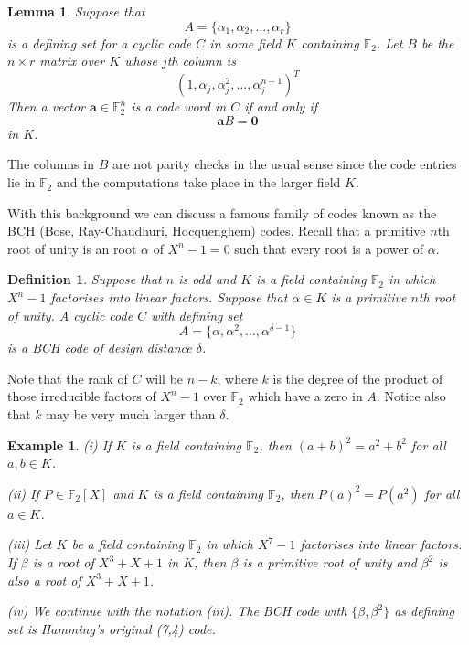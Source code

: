 \documentclass[12pt,a4paper]{article}
\theoremstyle{plain}
\newtheorem{lemma}[theorem]{Lemma}
\newtheorem{definition}[theorem]{Definition}
\newtheorem{example}[theorem]{Example}
\theoremstyle{definition}
\begin{document}
    \begin{lemma}
        \label{field check} Suppose that
        \[A=\{\alpha_{1},\alpha_{2},\dots,\alpha_{r}\}\]
        is a defining set for a cyclic
        code $C$  in some
        field $K$ containing ${\mathbb F}_{2}$.
        Let $B$ be the $n\times r$ matrix over $K$
        whose $j$th column is
        \[(1,\alpha_{j},\alpha_{j}^{2},\dots,\alpha_{j}^{n-1})^{T}\]
        Then a vector ${\mathbf a}\in{\mathbb F}_{2}^{n}$
        is a code word in $C$ if and only if
        \[{\mathbf a}B={\boldsymbol 0}\]
        in $K$.
    \end{lemma}
    \noindent
    The columns in $B$ are not parity checks in the usual
    sense since the code entries lie in ${\mathbb F}_{2}$
    and the computations take place in the larger field $K$.

    With this background we can
    discuss a famous family of codes known as
    the BCH (Bose, Ray-Chaudhuri, Hocquenghem) codes.
    Recall that a primitive $n$th root of unity is
    an root $\alpha$ of $X^{n}-1=0$
    such that every root is a power of $\alpha$.
    \begin{definition}
        \label{definition BCH}
        Suppose that $n$ is odd
        and $K$ is a field containing
        ${\mathbb F}_{2}$ in which $X^{n}-1$ factorises into
        linear factors. Suppose that
        $\alpha\in K$ is a primitive
        $n$th root of unity.
        A cyclic code $C$ with defining set
        \[A=\{\alpha,\alpha^{2},\dots,\alpha^{\delta-1}\}\]
        is a \emph{BCH code of design distance} $\delta$.
    \end{definition}
    \noindent
    Note that the rank of $C$ will be $n-k$, where $k$
    is the degree of the product of
    those irreducible factors
    of $X^{n}-1$ over ${\mathbb F}_{2}$ which have a
    zero in $A$. Notice also
    that $k$ may be very much larger
    than $\delta$.

    \begin{example}
        \label{Hamming BCH}
        (i) If $K$ is a field containing
        ${\mathbb F}_{2}$, then $(a+b)^{2}=a^{2}+b^{2}$
        for all $a,b\in K$.

        (ii) If $P\in {\mathbb F}_{2}[X]$ and $K$ is a field containing
        ${\mathbb F}_{2}$, then $P(a)^{2}=P(a^{2})$
        for all $a\in K$.

        (iii) Let $K$ be a field containing
        ${\mathbb F}_{2}$ in which $X^{7}-1$ factorises
        into linear factors. If $\beta$ is a root of $X^{3}+X+1$
        in $K$, then $\beta$ is a primitive root of unity
        and $\beta^{2}$ is also a root of $X^{3}+X+1$.

        (iv) We continue with the notation (iii).
        The BCH
        code with $\{\beta,\beta^{2}\}$ as defining set
        is Hamming's original (7,4) code.
    \end{example}
\end{document}
